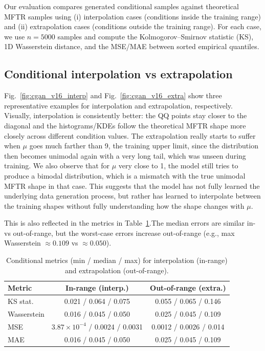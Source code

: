 Our evaluation compares generated conditional samples against theoretical MFTR samples using (i) interpolation cases (conditions inside the training range) and (ii) extrapolation cases (conditions outside the training range). For each case, we use $n=5000$ samples and compute the Kolmogorov--Smirnov statistic (KS), 1D Wasserstein distance, and the MSE/MAE between sorted empirical quantiles.

\subsection{Conditional interpolation vs extrapolation}
Fig.\ \ref{fig:cgan_v16_interp} and Fig.\ \ref{fig:cgan_v16_extra} show three representative examples for interpolation and extrapolation, respectively. Visually, interpolation is consistently better: the QQ points stay closer to the diagonal and the histograms/KDEs follow the theoretical MFTR shape more closely across different condition values. The extrapolation really starts to suffer when $\mu$ goes much farther than 9, the training upper limit, since the distribution then becomes unimodal again with a very long tail, which was unseen during training. We also observe that for $\mu$ very close to 1, the model still tries to produce a bimodal distribution, which is a mismatch with the true unimodal MFTR shape in that case. This suggests that the model has not fully learned the underlying data generation process, but rather has learned to interpolate between the training shapes without fully understanding how the shape changes with $\mu$.

This is also reflected in the metrics in Table\ \ref{tab:cgan_v16_cond_metrics}.The median errors are similar in- vs out-of-range, but the worst-case errors increase out-of-range (e.g., max Wasserstein $\approx 0.109$ vs $\approx 0.050$).

\begin{table}[h]
	\centering
	\caption{Conditional metrics (min / median / max) for interpolation (in-range) and extrapolation (out-of-range).}
	\label{tab:cgan_v16_cond_metrics}
	\small
	\begin{tabular}{lcc}
		\hline
		Metric & In-range (interp.) & Out-of-range (extra.) \\
		\hline
		KS stat. & 0.021 / 0.064 / 0.075 & 0.055 / 0.065 / 0.146 \\
		Wasserstein & 0.016 / 0.045 / 0.050 & 0.025 / 0.045 / 0.109 \\
		MSE & $3.87\times 10^{-4}$ / 0.0024 / 0.0031 & 0.0012 / 0.0026 / 0.014 \\
		MAE & 0.016 / 0.045 / 0.050 & 0.025 / 0.045 / 0.109 \\
		\hline
	\end{tabular}
\end{table}

